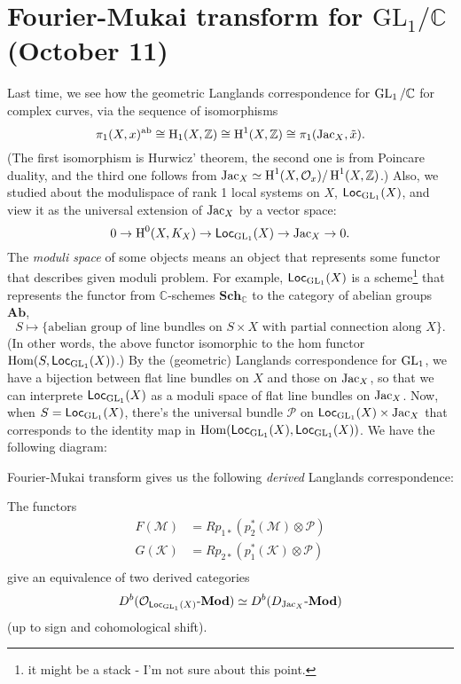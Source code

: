 \newpage
\section{Fourier-Mukai transform for $\mathrm{GL}_{1}/\mathbb{C}$ (October 11)}

Last time, we see how the geometric Langlands correspondence for $\operatorname{\mathrm{GL}}_1/\mathbb{C}$
for complex curves, via the sequence of isomorphisms
$$
\pi_1(X, x)^{\mathrm{ab}} \cong \operatorname{\mathrm{H}}_1(X, \mathbb{Z}) \cong \operatorname{\mathrm{H}}^{1}(X, \mathbb{Z}) \cong \pi_1(\operatorname{\mathrm{Jac}}_X, \tilde{x}).
$$
(The first isomorphism is Hurwicz' theorem, the second one is from Poincare duality, and the third one follows from
$\operatorname{\mathrm{Jac}}_X \simeq \operatorname{\mathrm{H}}^{1}(X, \mathcal{O}_x) / \operatorname{\mathrm{H}}^{1}(X,\mathbb{Z})$.)
Also, we studied about the modulispace of rank 1 local systems on $X$, $\operatorname{\mathsf{Loc}}_{\operatorname{\mathrm{GL}}_1}(X)$, 
and view it as the universal extension of $\operatorname{\mathrm{Jac}}_X$ by a vector space:
$$
0 \to \operatorname{\mathrm{H}}^{0}(X, K_X) \to \operatorname{\mathsf{Loc}}_{\operatorname{\mathrm{GL}}_1}(X) \to \operatorname{\mathrm{Jac}}_X \to 0.
$$
The \emph{moduli space} of some objects means an object that represents some functor that describes given moduli problem.
For example, $\operatorname{\mathsf{Loc}}_{\operatorname{\mathrm{GL}}_1}(X)$ is a scheme\footnote{it might be a stack - I'm not sure about this point.} that represents the functor
from $\mathbb{C}$-schemes $\mathbf{Sch}_{\mathbb{C}}$ to the category of abelian groups $\mathbf{Ab}$,
$$
S \mapsto \{\text{abelian group of line bundles on }S \times X\text{ with partial connection along }X\}.
$$
(In other words, the above functor isomorphic to the hom functor $\mathrm{Hom}(S, \operatorname{\mathsf{Loc}}_{\operatorname{\mathrm{GL}}_1}(X))$.)
By the (geometric) Langlands correspondence for $\operatorname{\mathrm{GL}}_1$, we have a bijection between
flat line bundles on $X$ and those on $\operatorname{\mathrm{Jac}}_X$, so that we can interprete $\operatorname{\mathsf{Loc}}_{\operatorname{\mathrm{GL}}_1}(X)$ as a moduli space
of flat line bundles on $\operatorname{\mathrm{Jac}}_X$.
Now, when $S = \operatorname{\mathsf{Loc}}_{\operatorname{\mathrm{GL}}_1}(X)$, there's the universal bundle $\mathcal{P}$ on $\operatorname{\mathsf{Loc}}_{\operatorname{\mathrm{GL}}_1}(X) \times \operatorname{\mathrm{Jac}}_X$
that corresponds to the identity map in $\mathrm{Hom}(\operatorname{\mathsf{Loc}}_{\operatorname{\mathrm{GL}}_1}(X), \operatorname{\mathsf{Loc}}_{\operatorname{\mathrm{GL}}_1}(X))$.
We have the following diagram:
\begin{center}
\end{center}
Fourier-Mukai transform gives us the following \emph{derived} Langlands correspondence:
\begin{theorem}
    The functors
    \begin{align*}
        F(\mathcal{M}) &= Rp_{1*}(p_{2}^{*}(\mathcal{M}) \otimes \mathcal{P}) \\
        G(\mathcal{K}) &= Rp_{2*}(p_{1}^{*}(\mathcal{K}) \otimes \mathcal{P}) \\
    \end{align*}
    give an equivalence of two derived categories
    $$
    D^{b}(\mathcal{O}_{\operatorname{\mathsf{Loc}}_{\operatorname{\mathrm{GL}}_1}(X)}\text{-}\mathbf{Mod}) \simeq D^{b}(D_{\operatorname{\mathrm{Jac}}_X}\text{-}\mathbf{Mod})
    $$
    (up to sign and cohomological shift).
\end{theorem}
